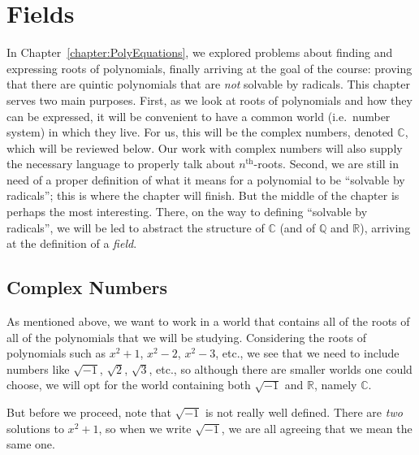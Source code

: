 \chapter{Fields}
\label{chapter:Fields}
\thispagestyle{empty}


In Chapter~\ref{chapter:PolyEquations}, we explored problems about finding and expressing roots of polynomials, finally arriving at the goal of the course: proving that there are quintic polynomials that are \emph{not} solvable by radicals. This chapter serves two main purposes. First, as we look at roots of polynomials and how they can be expressed, it will be convenient to have a common world (i.e.~number system) in which they live. For us, this will be the complex numbers, denoted $\mathbb{C}$, which will be reviewed below. Our work with complex numbers will also supply the necessary language to properly talk about $n^{\text{th}}$-roots. Second, we are still in need of a proper definition of what it means for a polynomial to be ``solvable by radicals''; this is where the chapter will finish. But the middle of the chapter is perhaps the most interesting. There, on the way to defining ``solvable by radicals'', we will be led to abstract the structure of $\mathbb{C}$ (and of $\mathbb{Q}$ and $\mathbb{R}$), arriving at the definition of a \emph{field}. 

\section{Complex Numbers}
As mentioned above, we want to work in a world that contains all of the roots of all of the polynomials that we will be studying. Considering the roots of polynomials such as $x^2 +1$, $x^2-2$, $x^2-3$, etc., we see that we need to include numbers like $\sqrt{-1}$, $\sqrt{2}$, $\sqrt{3}$, etc., so although there are smaller worlds one could choose, we will opt for the world containing both $\sqrt{-1}$ and $\mathbb{R}$, namely $\mathbb{C}$.

But before we proceed, note that $\sqrt{-1}$ is not really well defined. There are \emph{two} solutions to $x^2 +1$, so when we write $\sqrt{-1}$, we are all agreeing that we mean the same one. 

